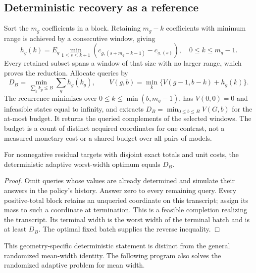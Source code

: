 \subsection{Deterministic recovery as a reference}
Sort the $m_g$ coefficients in a block. Retaining $m_g-k$ coefficients
with minimum range is achieved by a consecutive window, giving
\begin{equation}
 h_g(k)=E_g\min_{1\leq s\leq k+1}
       (c_{g,(s+m_g-k-1)}-c_{g,(s)}),\quad 0\leq k\leq m_g-1.
 \label{eq:window}
\end{equation}
Every retained subset spans a window of that size with no larger range,
which proves the reduction. Allocate queries by
\begin{equation}
 D_B=\min_{\sum_g k_g\leq B}\sum_g h_g(k_g),\qquad
 V(g,b)=\min_k\{V(g-1,b-k)+h_g(k)\}.
 \label{eq:allocation}
\end{equation}
The recurrence minimizes over $0\leq k\leq\min(b,m_g-1)$, has
$V(0,0)=0$ and infeasible states equal to infinity, and extracts
$D_B=\min_{0\leq b\leq B}V(G,b)$ for the at-most budget.
It returns the queried complements of the selected windows. The budget
is a count of distinct acquired coordinates for one contrast, not a
measured monetary cost or a shared budget over all pairs of models.

\begin{proposition}
\label{prop:det-adapt}
For nonnegative residual targets with disjoint exact totals and unit
costs, the deterministic adaptive worst-width optimum equals $D_B$.
\end{proposition}
\begin{proof}
Omit queries whose values are already determined and simulate their
answers in the policy's history. Answer zero to every remaining query.
Every positive-total block retains an unqueried coordinate on this
transcript; assign its mass to such a coordinate at termination. This is
a feasible completion realizing the transcript. Its terminal width is
the worst width of the terminal batch and is at least $D_B$. The optimal
fixed batch supplies the reverse inequality.
\end{proof}
This geometry-specific deterministic statement is distinct from the
general randomized mean-width identity. The following program also
solves the randomized adaptive problem for mean width.

